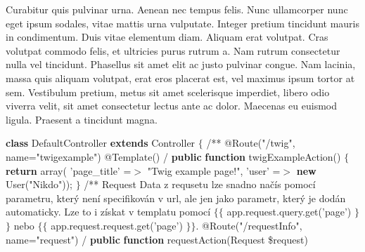 Curabitur quis pulvinar urna. Aenean nec tempus felis. Nunc ullamcorper nunc eget ipsum sodales, vitae mattis urna vulputate. Integer pretium tincidunt mauris in condimentum. Duis vitae elementum diam. Aliquam erat volutpat. Cras volutpat commodo felis, et ultricies purus rutrum a. Nam rutrum consectetur nulla vel tincidunt. Phasellus sit amet elit ac justo pulvinar congue. Nam lacinia, massa quis aliquam volutpat, erat eros placerat est, vel maximus ipsum tortor at sem. Vestibulum pretium, metus sit amet scelerisque imperdiet, libero odio viverra velit, sit amet consectetur lectus ante ac dolor. Maecenas eu euismod ligula. Praesent a tincidunt magna.

\bigbreak
\codetexNewline \typoscale[800/10]
 {\bf {\localcolor \Green class}} DefaultController {\bf {\localcolor \Green extends}} Controller\codetexNewline
{} $\{$\codetexNewline
{} \codetexNewline
{} {\localcolor \Grey /**}\codetexNewline
{} {\localcolor \Grey * @Route("/twig", name="twigexample")}\codetexNewline
{} {\localcolor \Grey * @Template()}\codetexNewline
{} {\localcolor \Grey */}\codetexNewline
{} {\bf {\localcolor \Green public}} {\bf {\localcolor \Green function}} twigExampleAction() $\{$\codetexNewline
{} {\bf {\localcolor \Green return}} array(\codetexNewline
{} {\localcolor \Cyan 'page\_title'} =$>$ {\localcolor \Cyan "Twig example page!"},\codetexNewline
{} {\localcolor \Cyan 'user'} =$>$ {\bf {\localcolor \Green new}} User({\localcolor \Cyan "Nikdo"}));\codetexNewline
{} $\}$\codetexNewline
{} \codetexNewline
{} {\localcolor \Grey /**}\codetexNewline
{} {\localcolor \Grey * Request}\codetexNewline
{} {\localcolor \Grey * Data z requsetu lze snadno načís pomocí parametru, který není specifikován v url, ale jen jako parametr,}\codetexNewline
{} {\localcolor \Grey * který je dodán automaticky.}\codetexNewline
{} {\localcolor \Grey * Lze to i získat v templatu pomocí $\{$$\{$ app.request.query.get('page') $\}$$\}$ nebo $\{$$\{$ app.request.request.get('page') $\}$$\}$.}\codetexNewline
{} {\localcolor \Grey *}\codetexNewline
{} {\localcolor \Grey * @Route("/requestInfo", name="request")}\codetexNewline
{} {\localcolor \Grey */}\codetexNewline
{} {\bf {\localcolor \Green public}} {\bf {\localcolor \Green function}} requestAction(Request \$request)\codetexNewline
